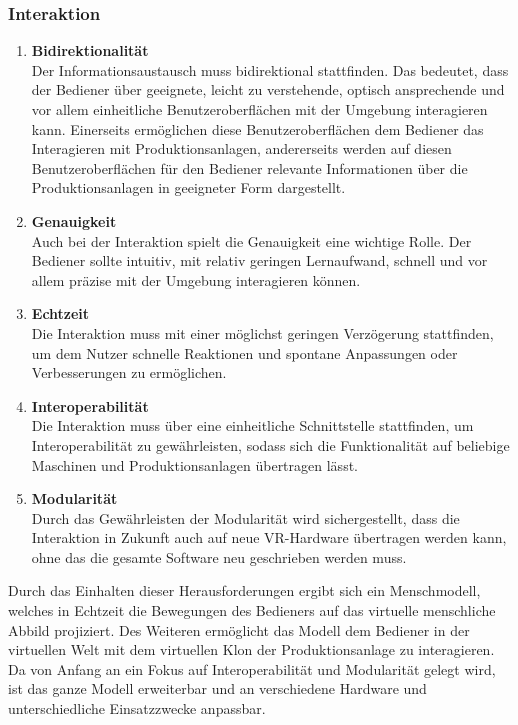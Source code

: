 \subsubsection{Interaktion}\label{sec:AnforderungenInteraktion}
\begin{enumerate}
	\item \textbf{Bidirektionalität} \\
	Der Informationsaustausch muss bidirektional stattfinden. Das bedeutet, dass der Bediener über geeignete, leicht zu verstehende, optisch ansprechende und vor allem einheitliche Benutzeroberflächen mit der Umgebung interagieren kann. Einerseits ermöglichen diese Benutzeroberflächen dem Bediener das Interagieren mit Produktionsanlagen, andererseits werden auf diesen Benutzeroberflächen für den Bediener relevante Informationen über die Produktionsanlagen in geeigneter Form dargestellt.
	\item \textbf{Genauigkeit} \\
	Auch bei der Interaktion spielt die Genauigkeit eine wichtige Rolle. Der Bediener sollte intuitiv, mit relativ geringen Lernaufwand, schnell und vor allem präzise mit der Umgebung interagieren können.
	\item \textbf{Echtzeit} \\
	Die Interaktion muss mit einer möglichst geringen Verzögerung stattfinden, um dem Nutzer schnelle Reaktionen und spontane Anpassungen oder Verbesserungen zu ermöglichen.
	\item \textbf{Interoperabilität} \\
	Die Interaktion muss über eine einheitliche Schnittstelle stattfinden, um Interoperabilität zu gewährleisten, sodass sich die Funktionalität auf beliebige Maschinen und Produktionsanlagen übertragen lässt.
	\item \textbf{Modularität} \\
	Durch das Gewährleisten der Modularität wird sichergestellt, dass die Interaktion in Zukunft auch auf neue VR-Hardware übertragen werden kann, ohne das die gesamte Software neu geschrieben werden muss.
\end{enumerate}
Durch das Einhalten dieser Herausforderungen ergibt sich ein Menschmodell, welches in Echtzeit die Bewegungen des Bedieners auf das virtuelle menschliche Abbild projiziert. Des Weiteren ermöglicht das Modell dem Bediener in der virtuellen Welt mit dem virtuellen Klon der Produktionsanlage zu interagieren. Da von Anfang an ein Fokus auf Interoperabilität und Modularität gelegt wird, ist das ganze Modell erweiterbar und an verschiedene Hardware und unterschiedliche Einsatzzwecke anpassbar.
\newpage


